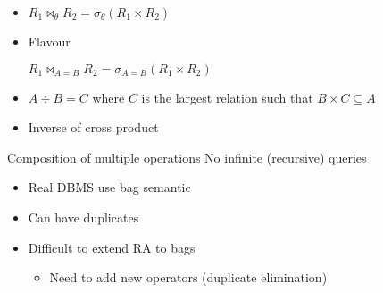 \begin{itemize}
\begin{itemize}
\begin{itemize}
\begin{itemize}
                        \end{itemize}
                \end{itemize}
                \begin{itemize}
                    \item $R_1 \bowtie_\theta R_2 = \sigma_\theta (R_1 \times R_2)$
                    \item Flavour
                        \begin{itemize}
                             $R_1 \bowtie_{A=B} R_2 = \sigma_{A=B} (R_1 \times R_2)$
                        \end{itemize}
                \end{itemize}
                \begin{itemize}
                    \item $A \div B = C$ where $C$ is the largest relation such that $B \times C \subseteq A$
                    \item Inverse of cross product
                \end{itemize}
        \end{itemize}
     Composition of multiple operations
    \icon No infinite (recursive) queries
        \begin{itemize}
            \item Real DBMS use bag semantic
            \item Can have duplicates
            \item Difficult to extend RA to bags
                \begin{itemize}
                    \item Need to add new operators (duplicate elimination)
                \end{itemize}
        \end{itemize}
\end{itemize}
